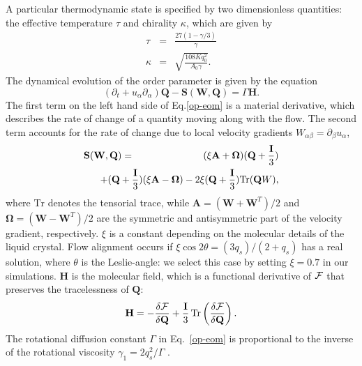 \documentclass[aps,pre,reprint,superscriptaddress, twocolumn]{revtex4}
\begin{document}
A particular thermodynamic state is specified by two dimensionless quantities: the effective temperature $\tau$ and chirality $\kappa$,
which are given by
\begin{eqnarray}
\tau&=&\frac{27(1-\gamma/3)}{\gamma}\nonumber\\
\kappa&=&\sqrt{\frac{108 K q_0^2}{A_0 \gamma}}\nonumber.
\end{eqnarray}
The dynamical evolution of the order parameter is given by the equation 
\begin{equation}
\left(\partial_t+ u_\alpha \partial_\alpha \right){\mathbf Q} - {\mathbf S}({\mathbf W},{\mathbf Q}) = \Gamma {\mathbf H}.
\label{op-eom}
\end{equation}
The first term on the left hand side of Eq.\ref{op-eom} is a material derivative, which describes the rate of change of a quantity moving along with the flow.
The second term accounts for the rate of change due to local velocity gradients $W_{\alpha \beta}=\partial_\beta u_\alpha$,
\begin{eqnarray}
{\mathbf S}({\mathbf W}, {\mathbf Q}) &=& (\xi {\mathbf A} + {\boldsymbol \Omega})({\mathbf Q}+\frac{\mathbf I}{3})\nonumber\\
& &\hspace*{-1.5cm}+ ({\mathbf Q}+\frac{\mathbf I}{3})(\xi {\mathbf A}  - {\boldsymbol \Omega})-2 \xi ({\mathbf Q}+\frac{\mathbf I}{3})
\mathrm{Tr}({\mathbf Q W}),
\label{sw}
\end{eqnarray}
where $\mathrm{Tr}$ denotes the tensorial trace, while 
${\mathbf A}=({\mathbf W}+{\mathbf W}^T)/2$ and
${\boldsymbol \Omega}=({\mathbf W}-{\mathbf W}^T)/2$ are the symmetric and antisymmetric part of the velocity gradient, respectively. $\xi$ 
is a constant depending on the molecular details of the liquid crystal.
Flow alignment occurs if $\xi \cos{2\theta}=(3q_s)/(2+q_s)$ has a real solution, where $\theta$ is the Leslie-angle: we select this case by 
setting $\xi=0.7$ in our simulations.
${\mathbf H}$ is the molecular field, which is a functional derivative of $\cal F$ that preserves the tracelessness of $\mathbf Q$:
\begin{equation}
{\bf H}=-\frac{\delta {\cal F}}{\delta {\bf Q}}+\frac{\bf I}{3}\,
\mathrm{Tr} \left(\frac{\delta {\cal F}}{\delta {\bf Q}}\right).
\label{molfield}
\end{equation}
The rotational diffusion constant $\Gamma$ in Eq.~\ref{op-eom} is proportional
to the inverse of the rotational viscosity $\gamma_1=2 q_s^2/\Gamma$
\cite{deGennes}.
\end{document}
